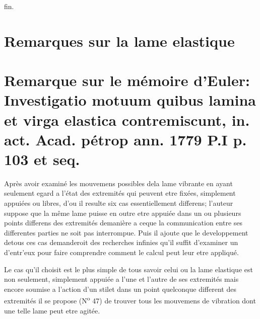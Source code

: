 \documentclass[11pt,a4paper]{article}
\begin{document}
fin.


\section{Remarques sur la lame elastique}


\section{Remarque sur le mémoire d'Euler: Investigatio motuum quibus lamina et virga elastica contremiscunt, in. act. Acad. pétrop ann. 1779 P.I p. 103 et seq.}

Après avoir examiné les mouvemens possibles dela lame vibrante en ayant seulement
egard a l'état des extremités qui peuvent etre fixées, simplement appuiées ou libres,
d'ou il resulte six cas essentiellement differens; l'auteur suppose que la même lame
puisse en outre etre appuiée dans un ou plusieurs points differens des extremités
demanière a ceque la communication entre ses differentes parties ne soit pas
interrompue. Puis il ajoute que le developpement detous ces cas demanderoit des
recherches infinies  qu'il suffit d'examiner un d'entr'eux pour faire comprendre
comment le calcul peut leur etre appliqué.

Le cas qu'il choisit est le plus simple de tous  savoir celui ou
la lame elastique est non seulement, simplement appuiée a l'une et l'autre de ses
extremités mais encore soumise a l'action d'un stilet dans un point quelconque
different des extremités il se propose (N\textsuperscript{o} 47) de trouver tous les mouvemens
de vibration dont une telle lame peut etre agitée.
\end{document}
